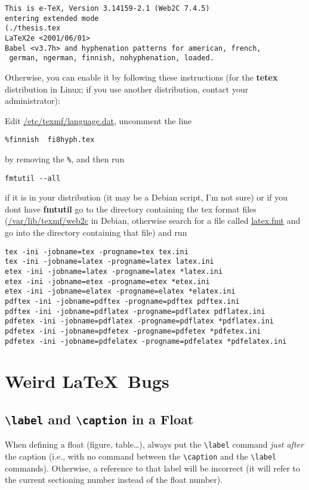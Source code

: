 \documentclass[a4paper,12pt]{article}
\newcommand{\cmd}[1]{\texttt{\textbackslash#1}}
\newcommand{\prog}[1]{\textbf{\textsf{#1}}}
\begin{document}
\begin{verbatim}
This is e-TeX, Version 3.14159-2.1 (Web2C 7.4.5)
entering extended mode
(./thesis.tex
LaTeX2e <2001/06/01>
Babel <v3.7h> and hyphenation patterns for american, french,
 german, ngerman, finnish, nohyphenation, loaded.
\end{verbatim}

Otherwise, you can enable it by following these instructions (for the
\prog{tetex} distribution in Linux; if you use another distribution, contact
your administrator):

\noindent Edit \url{/etc/texmf/language.dat}, uncomment the line
\smallskip

\verb"%finnish  fi8hyph.tex"
\smallskip

\noindent by removing the \verb"%", and then run
\smallskip

\verb"fmtutil --all"
\smallskip

\noindent if it is in your distribution (it may be a Debian script, I'm not
sure) or if you dont have \prog{fmtutil} go to the directory containing the
tex format files (\url{/var/lib/texmf/web2c} in Debian, otherwise search for a
file called \url{latex.fmt} and go into the directory containing that file)
and run

\begin{verbatim}
tex -ini -jobname=tex -progname=tex tex.ini
tex -ini -jobname=latex -progname=latex latex.ini
etex -ini -jobname=latex -progname=latex *latex.ini
etex -ini -jobname=etex -progname=etex *etex.ini
etex -ini -jobname=elatex -progname=elatex *elatex.ini
pdftex -ini -jobname=pdftex -progname=pdftex pdftex.ini
pdftex -ini -jobname=pdflatex -progname=pdflatex pdflatex.ini
pdfetex -ini -jobname=pdflatex -progname=pdflatex *pdflatex.ini
pdfetex -ini -jobname=pdfetex -progname=pdfetex *pdfetex.ini
pdfetex -ini -jobname=pdfelatex -progname=pdfelatex *pdfelatex.ini
\end{verbatim}

\section{Weird \LaTeX\ Bugs}

\subsection{\cmd{label} and \cmd{caption} in a Float}
When defining a float (figure, table\dots), always put the \cmd{label} command
\emph{just after} the caption (i.e., with no command between the \cmd{caption}
and the \cmd{label} commands). Otherwise, a reference to that label will be
incorrect (it will refer to the current sectioning number instead of the float
number).
\end{document}
